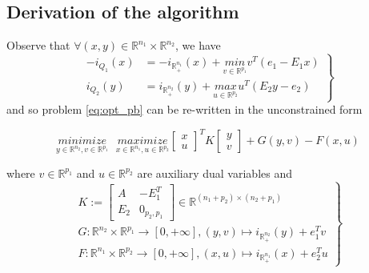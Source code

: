 \documentclass[a4paper,9pt,journal]{IEEEtran}
\begin{document}

\subsection{Derivation of the algorithm}
Observe that $\forall (x, y) \in \mathbb{R}^{n_1} \times \mathbb{R}^{n_2}$, we have
\begin{equation}
  \left .
  \begin{split}
    -i_{Q_1}(x) &= -i_{\mathbb{R}^{n_1}_+}(x) + \underset{v \in \mathbb{R}^{p_1}}{min}\text{}{v^T(e_1 - E_1x)}\\
  i_{Q_2}(y) &= i_{\mathbb{R}^{n_2}_+}(y) + \underset{u \in \mathbb{R}^{p_2}}{max}\text{}{u^T(E_2y - e_2)}
  \end{split}
  \right\}
\end{equation}
and so problem \eqref{eq:opt_pb} can be re-written in the unconstrained form

\begin{equation}
  \underset{y \in \mathbb{R}^{n_2}, v\in \mathbb{R}^{p_1}}{minimize}\text{ }\underset{x \in \mathbb{R}^{n_1}, u \in \mathbb{R}^{p_2}}{maximize}
           {\begin{bmatrix}x\\u\end{bmatrix}^TK\begin{bmatrix}y\\v\end{bmatrix} + G(y, v) - F(x, u)}
  \label{eq:my_opt_pb}
\end{equation}

where $v \in \mathbb{R}^{p_1}$ and $u \in \mathbb{R}^{p_2}$ are auxiliary dual variables and 
\begin{equation}
  \left .
  \begin{split}
    K :=
    \left[
      \begin{array}{c|c}
        A & -E_1^T \\ \hline
        E_2 & 0_{p_2, p_1}
      \end{array}
      \right] \in \mathbb{R}^{(n_1 + p_2) \times (n_2 + p_1)} \\
      G: \mathbb{R}^{n_2} \times \mathbb{R}^{p_1} \rightarrow [0, +\infty], (y, v) \mapsto i_{\mathbb{R}^{n_2}_+}(y) + e_1^Tv\\
      F: \mathbb{R}^{n_1} \times \mathbb{R}^{p_2} \rightarrow [0, +\infty], (x, u) \mapsto i_{\mathbb{R}^{n_1}_+}(x) + e_2^Tu
  \end{split}
  \right\}
\end{equation}
\end{document}

